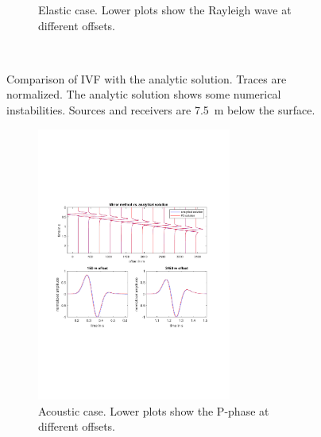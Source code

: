 \documentclass[pdftex,a4paper,parskip,listof=totoc,bibliography=totoc,onehalfspacing,12pt]{scrreprt}
\begin{document}
\begin{figure}
\begin{subfigure}[b]{1.0\textwidth}
    \caption{Elastic case. Lower plots show the Rayleigh wave at different offsets.}
  \end{subfigure} \\
  \caption{Comparison of IVF with the analytic solution. Traces are normalized. The analytic solution shows some numerical instabilities. Sources and receivers are \SI{7.5}{\meter} below the surface.}\label{fig:IVFvsAnalytic}
\end{figure}

\begin{figure}
  \centering
  \begin{subfigure}[b]{1.0\textwidth}
    \centering
    \includegraphics[width=0.7\textwidth,trim=2cm 7cm 2cm 7cm, clip=true]{images/fd_vs_analytic_acoustic_mirror.pdf}
    \caption{Acoustic case. Lower plots show the P-phase at different offsets.}
  \end{subfigure} \\
  \begin{subfigure}[b]{1.0\textwidth}
    \centering

\end{subfigure}
\end{figure}
\end{document}
